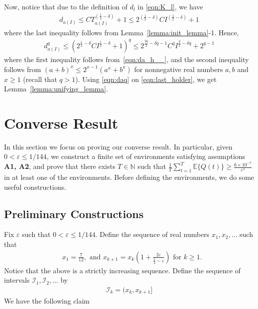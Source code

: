 \documentclass[12pt,draftcls, onecolumn]{IEEEtran}
\begin{document}
Now, notice that due to the definition of $d_l$ in \eqref{eqn:K_l}, we have
\begin{align}\label{eqn:da_h__}
    d_{a(I)} \leq  CT_{a(I)}^{\left(\frac{1}{2}-\delta\right)}+1 \leq 2^{\left(\frac{1}{2}-\delta\right)} CI^{\left(\frac{1}{2}-\delta\right)}+1
\end{align}
where the last inequality follows from Lemma~\ref{lemma:init_lemma}-1.
Hence,
\begin{align}\label{eqn:daq}
    d^q_{a(I)} \leq \left(2^{\frac{1}{2}-\delta
    }CI^{\frac{1}{2}-\delta
    }+1\right)^q  \leq 2^{\frac{3q}{2}-\delta q-1}C^qI^{\frac{q}{2}-\delta q}+2^{q-1} 
\end{align}
where the first inequality follows from~\eqref{eqn:da_h__}, and the second inequality follows from $(a+b)^x \leq 2^{x-1}(a^x+b^x)$ for nonnegative real numbers $a,b$ and $x \geq 1$ (recall that $q>1$). Using \eqref{eqn:daq} on \eqref{eqn:last_holder}, we get Lemma~\ref{lemma:unifying_lemma}.
\section{Converse Result}\label{sec:converse}
In this section we focus on proving our converse result. In particular, given $0 < \varepsilon \leq 1/144$,  we construct a finite set of environments satisfying assumptions \textbf{A1, A2}, and prove that there exists $T \in \mathbb{N}$ such that $\frac{1}{T}\sum_{t=1}^T \mathbb{E}\{Q(t)\} \geq \frac{6 \times 10^{-7}}{\varepsilon^2}$ in at least one of the environments.  Before defining the environments, we do some useful constructions.
\subsection{Preliminary Constructions}\label{sec:prel_cons}
Fix $\varepsilon$ such that $0 < \varepsilon \leq 1/144$. Define the sequence of real numbers $x_1,x_2,\dots$ such that
\begin{align}\label{eqn:x_def}
    &x_1 = \frac{7}{12}, \text{ and }x_{k+1} = x_k\left(1+ \frac{2\varepsilon}{\frac{1}{2}-\varepsilon}\right) \text{ for } k \geq 1.
\end{align}
Notice that the above is a strictly increasing sequence. Define the sequence of intervals $\mathcal{I}_1,\mathcal{I}_2,\dots$ by
\begin{align}\label{eqn:int_x_k}
    \mathcal{I}_k = (x_k,x_{k+1}]
\end{align}
We have the following claim
\end{document}
